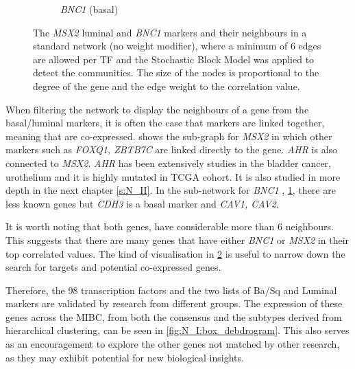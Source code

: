\begin{figure}[!t]
\begin{subfigure}[!t]{0.49\textwidth}
        \caption{\textit{BNC1} (basal)}
        \label{fig:N_I:net_BNC1}
    \end{subfigure}
    \caption[Network neighbours of \textit{MSX2} and \textit{BNC1}]{The \textit{MSX2} luminal and \textit{BNC1} markers and their neighbours in a standard network (no weight modifier), where a minimum of 6 edges are allowed per TF and the Stochastic Block Model was applied to detect the communities. The size of the nodes is proportional to the degree of the gene and the edge weight to the correlation value.}
    
    \label{fig:N_I:net_neighbours}
\end{figure}

When filtering the network to display the neighbours of a  gene from the basal/luminal markers, it is often the case that markers are linked together, meaning that are co-expressed.  shows the sub-graph for \textit{MSX2} in which other markers such as \textit{FOXQ1, ZBTB7C} are linked directly to the gene. \textit{AHR} is also connected to \textit{MSX2}. \textit{AHR} has been extensively studies in the bladder cancer, urothelium and it is highly mutated in TCGA cohort. It is also studied in more depth in the next chapter \ref{s:N_II}. In the sub-network for \textit{BNC1} , \cref{fig:N_I:net_BNC1}, there are less known genes but \textit{CDH3} is a basal marker \citep{Dadhania2016-cb} and \textit{CAV1, CAV2}. 

It is worth noting that both genes, have considerable more than 6 neighbours. This suggests that there are many genes that have either \textit{BNC1} or \textit{MSX2} in their top correlated values. The kind of visualisation in \cref{fig:N_I:net_neighbours} is useful to narrow down the search for targets and potential co-expressed genes.


Therefore, the 98 transcription factors and the two lists of Ba/Sq and Luminal markers are validated by research from different groups. The expression of these genes across the MIBC, from both the consensus and the subtypes derived from hierarchical clustering, can be seen in \cref{fig:N_I:box_debdrogram}. This also serves as an encouragement to explore the other genes not matched by other research, as they may exhibit potential for new biological insights.


